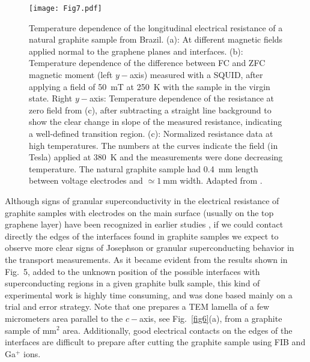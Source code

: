 \documentclass[aps,dvipsnames,twocolumn,floatfix,amsmath]{revtex4-1}
\begin{document}
\begin{figure*}
  \texttt{[image: Fig7.pdf]}
\caption{Temperature dependence of the longitudinal electrical
resistance of a natural graphite sample from Brazil. (a): At
different magnetic fields applied normal to the graphene planes
and interfaces.  (b): Temperature dependence of the difference
between FC  and ZFC
 magnetic moment (left $y-$axis) measured with
a SQUID, after applying a field of 50~mT at 250~K with the sample
in the virgin state. Right $y-$axis: Temperature dependence of the
resistance at zero field from (c), after subtracting a straight
line background to show the clear change in slope of the measured
resistance, indicating a well-defined transition region.  (c):
Normalized resistance data at high temperatures. The numbers at
the curves indicate the field (in Tesla) applied at 380~K and the
measurements were done decreasing temperature. The natural
graphite sample had 0.4~mm length between voltage electrodes and
$\simeq 1~$mm width. Adapted from \cite{pre16}.}
\label{fig7}       %
\end{figure*}


Although signs of granular superconductivity in the electrical resistance of
graphite samples with electrodes on the main surface (usually on the top  graphene layer)
have been  recognized in earlier studies \cite{esq08,sru11}, if we could contact
directly the edges of the interfaces found in graphite
samples we expect to observe more clear signs of Josephson or granular superconducting behavior in the
transport measurements. As it became evident from the results shown in Fig.~5,
added to the unknown position of the possible interfaces with superconducting regions in
a given graphite bulk sample,
this kind of experimental work is highly time consuming, and was done based  mainly on a trial and error
strategy. Note that one prepares a TEM lamella of a few micrometers area parallel to the
$c-$axis, see Fig.~\ref{fig6}(a), from a graphite sample of mm$^2$ area.  Additionally,
good electrical contacts on the edges of the interfaces are difficult to prepare after cutting
the graphite sample using FIB and Ga$^+$ ions.
\end{document}
